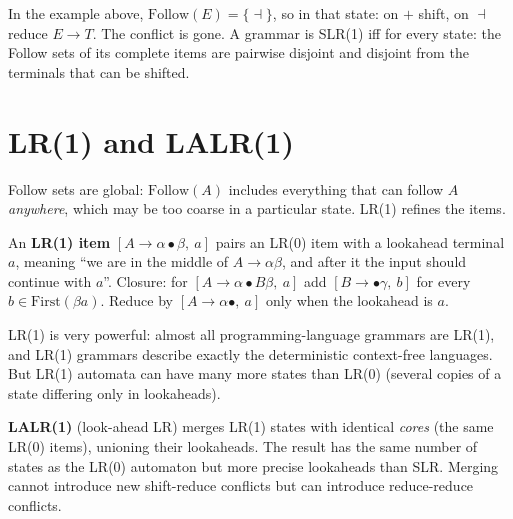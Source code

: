 In the example above, $\mathrm{Follow}(E) = \{\dashv\}$, so in that state: on $+$ shift, on
$\dashv$ reduce $E\to T$. The conflict is gone. A grammar is SLR(1) iff for every state:
the Follow sets of its complete items are pairwise disjoint and disjoint from the terminals
that can be shifted.

\section{LR(1) and LALR(1)}

Follow sets are global: $\mathrm{Follow}(A)$ includes everything that can follow $A$
\emph{anywhere}, which may be too coarse in a particular state. LR(1) refines the items.

\begin{definition}
An \textbf{LR(1) item} $[A\to\alpha\bullet\beta,\ a]$ pairs an LR(0) item with a lookahead
terminal $a$, meaning ``we are in the middle of $A\to\alpha\beta$, and after it the input
should continue with $a$''. Closure: for $[A\to\alpha\bullet B\beta,\ a]$ add
$[B\to\bullet\gamma,\ b]$ for every $b \in \mathrm{First}(\beta a)$. Reduce by
$[A\to\alpha\bullet,\ a]$ only when the lookahead is $a$.
\end{definition}

LR(1) is very powerful: almost all programming-language grammars are LR(1), and LR(1)
grammars describe exactly the deterministic context-free languages. But LR(1) automata can
have many more states than LR(0) (several copies of a state differing only in lookaheads).

\textbf{LALR(1)} (look-ahead LR) merges LR(1) states with identical \emph{cores} (the same
LR(0) items), unioning their lookaheads. The result has the same number of states as the
LR(0) automaton but more precise lookaheads than SLR. Merging cannot introduce new
shift-reduce conflicts but can introduce reduce-reduce conflicts.

